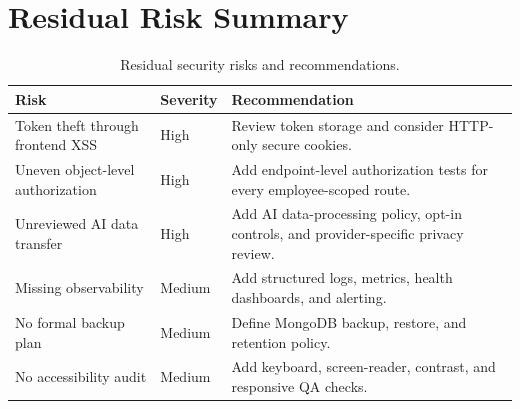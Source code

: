 \section{Residual Risk Summary}
\begin{table}[H]\centering\small
\caption{Residual security risks and recommendations.}
\label{tab:security-risks}
\begin{tabularx}{\textwidth}{p{}p{}Y}
\toprule
Risk & Severity & Recommendation\\
\midrule
Token theft through frontend XSS & High & Review token storage and consider HTTP-only secure cookies.\\
Uneven object-level authorization & High & Add endpoint-level authorization tests for every employee-scoped route.\\
Unreviewed AI data transfer & High & Add AI data-processing policy, opt-in controls, and provider-specific privacy review.\\
Missing observability & Medium & Add structured logs, metrics, health dashboards, and alerting.\\
No formal backup plan & Medium & Define MongoDB backup, restore, and retention policy.\\
No accessibility audit & Medium & Add keyboard, screen-reader, contrast, and responsive QA checks.\\
\bottomrule
\end{tabularx}
\end{table}
